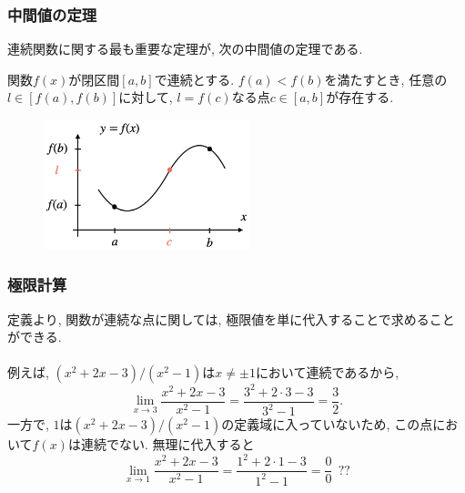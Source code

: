 

\begin{frame}
\frametitle{中間値の定理} 

連続関数に関する最も重要な定理が, 次の中間値の定理である. 

\begin{Thm}[中間値の定理]
関数$f(x)$が閉区間$[a,b]$で連続とする. 
$f(a) <  f(b)$を満たすとき, 任意の$l \in [f(a), f(b)]$に対して, $l=f(c)$なる点$c \in [a,b]$が存在する. 
\end{Thm}

 \begin{figure}[htbp]
 \begin{center} 
  \includegraphics[width=60mm]{calculus3/mean_value.png}
 \end{center}
\end{figure}


\end{frame}



\begin{frame}
\frametitle{極限計算} 



定義より, 関数が連続な点に関しては, 極限値を単に代入することで求めることができる. \\
\ \\

例えば, $(x^2+2x-3)/(x^2-1)$は$x\neq \pm1$において連続であるから, 
$$
\lim_{x \to 3} \frac{x^2+2x-3}{x^2-1}=\frac{3^2+2\cdot 3-3}{3^2-1}=\frac{3}{2}. 
$$
一方で, $1$は$(x^2+2x-3)/(x^2-1)$の定義域に入っていないため, この点において$f(x)$は連続でない. 
無理に代入すると
$$
\lim_{x \to 1} \frac{x^2+2x-3}{x^2-1}=\frac{1^2+2\cdot 1-3}{1^2-1}=\frac{0}{0} \ \ ?? 
$$
\end{frame}



